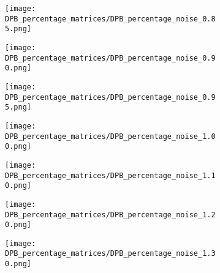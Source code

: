 \begin{figure}[H] \ContinuedFloat%
    \centering
    \begin{subfigure}{0.48\textwidth}
        \texttt{[image: DPB\_percentage\_matrices/DPB\_percentage\_noise\_0.85.png]}
        \caption{} %
    \end{subfigure}\hfill
    \begin{subfigure}{0.48\textwidth}
        \texttt{[image: DPB\_percentage\_matrices/DPB\_percentage\_noise\_0.90.png]}
        \caption{} %
    \end{subfigure}

    \bigskip %

    \begin{subfigure}{0.48\textwidth}
        \texttt{[image: DPB\_percentage\_matrices/DPB\_percentage\_noise\_0.95.png]}
        \caption{} %
    \end{subfigure}\hfill
    \begin{subfigure}{0.48\textwidth}
        \texttt{[image: DPB\_percentage\_matrices/DPB\_percentage\_noise\_1.00.png]}
        \caption{} %
    \end{subfigure}
\end{figure}

\begin{figure}[H] \ContinuedFloat%
    \centering
    \begin{subfigure}{0.48\textwidth}
        \texttt{[image: DPB\_percentage\_matrices/DPB\_percentage\_noise\_1.10.png]}
        \caption{} %
    \end{subfigure}\hfill
    \begin{subfigure}{0.48\textwidth}
        \texttt{[image: DPB\_percentage\_matrices/DPB\_percentage\_noise\_1.20.png]}
        \caption{} %
    \end{subfigure}

    \bigskip %

    \begin{subfigure}{0.48\textwidth}
        \texttt{[image: DPB\_percentage\_matrices/DPB\_percentage\_noise\_1.30.png]}
        \caption{} %
    \end{subfigure}
\end{figure}
\pagebreak

